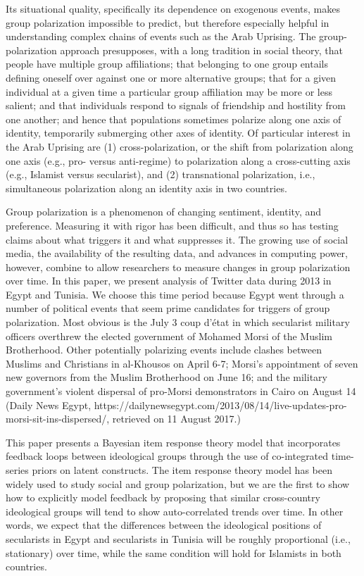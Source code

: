 \documentclass[12pt]{article}
\begin{document}
Its situational quality, specifically its dependence on exogenous events, makes group polarization impossible to predict, but therefore especially helpful in understanding complex chains of events such as the Arab Uprising.  The group-polarization approach presupposes, with a long tradition in social theory, that people have multiple group affiliations; that belonging to one group entails defining oneself over against one or more alternative groups; that for a given individual at a given time a particular group affiliation may be more or less salient; and that individuals respond to signals of friendship and hostility from one another; and hence that populations sometimes polarize along one axis of identity, temporarily submerging other axes of identity.  Of particular interest in the Arab Uprising are (1) cross-polarization, or the shift from polarization along one axis (e.g., pro- versus anti-regime) to polarization along a cross-cutting axis (e.g., Islamist versus secularist), and (2) transnational polarization, i.e., simultaneous polarization along an identity axis in two countries.

Group polarization is a phenomenon of changing sentiment, identity, and preference.  Measuring it with rigor has been difficult, and thus so has testing claims about what triggers it and what suppresses it.  The growing use of social media, the availability of the resulting data, and advances in computing power, however, combine to allow researchers to measure changes in group polarization over time.  In this paper, we present analysis of Twitter data during 2013 in Egypt and Tunisia.  We choose this time period because Egypt went through a number of political events that seem prime candidates for triggers of group polarization.  Most obvious is the July 3 coup d'état in which secularist military officers overthrew the elected government of Mohamed Morsi of the Muslim Brotherhood.  Other potentially polarizing events include clashes between Muslims and Christians in al-Khousos on April 6-7; Morsi's appointment of seven new governors from the Muslim Brotherhood on June 16; and the military government's violent dispersal of pro-Morsi demonstrators in Cairo on August 14 (Daily News Egypt, https://dailynewsegypt.com/2013/08/14/live-updates-pro-morsi-sit-ins-dispersed/, retrieved on 11 August 2017.) 

This paper presents a Bayesian item response theory model that incorporates feedback loops between ideological groups through the use of co-integrated time-series priors on latent constructs. The item response theory model has been widely used to study social and group polarization, but we are the first to show how to explicitly model feedback by proposing that similar cross-country ideological groups will tend to show auto-correlated trends over time. In other words, we expect that the differences between the ideological positions of secularists in Egypt and secularists in Tunisia will be roughly proportional (i.e., stationary) over time, while the same condition will hold for Islamists in both countries. 
\end{document}
